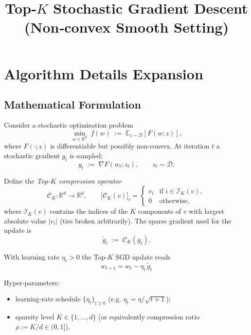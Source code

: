 \documentclass[11pt]{article}
\newcommand{\E}{\mathbb{E}}
\newcommand{\R}{\mathbb{R}}
\begin{document}
\title{Top‑\(K\) Stochastic Gradient Descent\\
(Non‑convex Smooth Setting)}
\author{}
\date{}
\maketitle

\section*{Algorithm Details Expansion}

\subsection*{Mathematical Formulation}
Consider a stochastic optimisation problem
\[
\min_{w\in\R^{d}} \; f(w)\;:=\;\E_{z\sim\mathcal{D}}[F(w;z)],
\]
where \(F(\cdot;z)\) is differentiable but possibly non‑convex.
At iteration \(t\) a stochastic gradient \(g_t\) is sampled:
\[
g_t \;:=\; \nabla F(w_t;z_t), \qquad z_t\sim\mathcal{D}.
\]

Define the \emph{Top‑\(K\) compression operator}
\[
\mathcal{C}_K:\R^{d}\to\R^{d},\qquad
\big[\mathcal{C}_K(v)\big]_i=
\begin{cases}
v_i & \text{if }i\in\mathcal{I}_K(v),\\[2mm]
0   & \text{otherwise},
\end{cases}
\]
where \(\mathcal{I}_K(v)\) contains the indices of the \(K\) components of
\(v\) with largest absolute value \(|v_i|\) (ties broken arbitrarily).
The sparse gradient used for the update is
\[
\tilde g_t \;:=\; \mathcal{C}_K(g_t).
\]

With learning rate \(\eta_t>0\) the Top‑\(K\) SGD update reads
\[
\boxed{ \; w_{t+1}= w_t - \eta_t \,\tilde g_t \;}
\tag{1}
\]

Hyper‑parameters:
\begin{itemize}
\item learning‑rate schedule \(\{\eta_t\}_{t\ge0}\) (e.g. \(\eta_t=\eta/\sqrt{t+1}\));
\item sparsity level \(K\in\{1,\dots,d\}\) (or equivalently compression ratio
\(\rho:=K/d\in(0,1]\)).
\end{itemize}
\end{document}
